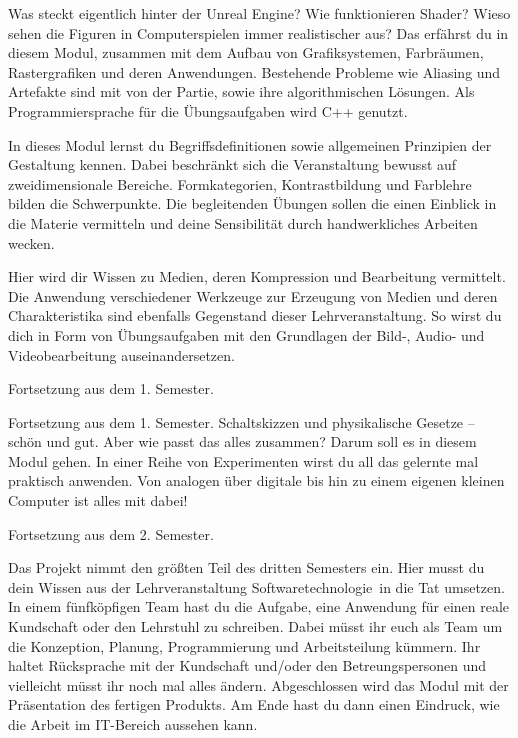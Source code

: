 Was steckt eigentlich hinter der Unreal Engine? Wie funktionieren Shader? 
Wieso sehen die Figuren in Computerspielen immer realistischer aus?
Das erfährst du in diesem Modul, zusammen mit dem Aufbau von Grafiksystemen, Farbräumen, Rastergrafiken und deren Anwendungen.
Bestehende Probleme wie Aliasing und Artefakte sind mit von der Partie, sowie ihre algorithmischen Lösungen.
Als Programmiersprache für die Übungsaufgaben wird C++ genutzt.

In dieses Modul lernst du Begriffsdefinitionen sowie allgemeinen Prinzipien der Gestaltung kennen.
Dabei beschränkt sich die Veranstaltung bewusst auf zweidimensionale Bereiche.
Formkategorien, Kontrastbildung und Farblehre bilden die Schwerpunkte.
Die begleitenden Übungen sollen die einen Einblick in die Materie vermitteln und deine Sensibilität durch handwerkliches Arbeiten wecken.

Hier wird dir Wissen zu Medien, deren Kompression und Bearbeitung vermittelt.
Die Anwendung verschiedener Werkzeuge zur Erzeugung von Medien und deren Charakteristika sind ebenfalls Gegenstand dieser Lehrveranstaltung.
So wirst du dich in Form von Übungsaufgaben mit den Grundlagen der Bild-, Audio- und Videobearbeitung auseinandersetzen.

Fortsetzung aus dem 1. Semester.

Fortsetzung aus dem 1. Semester. Schaltskizzen und physikalische Gesetze -- schön und gut. Aber wie passt das alles zusammen?
Darum soll es in diesem Modul gehen. In einer Reihe von Experimenten wirst du all das gelernte mal praktisch anwenden.
Von analogen über digitale bis hin zu einem eigenen kleinen Computer ist alles mit dabei!

\newpage


Fortsetzung aus dem 2. Semester.

Das Projekt nimmt den größten Teil des dritten Semesters ein.
Hier musst du dein Wissen aus der Lehrveranstaltung \glqq Softwaretechnologie\grqq\ in die Tat umsetzen.
In einem fünfköpfigen Team hast du die Aufgabe, eine Anwendung für einen reale Kundschaft oder den Lehrstuhl zu schreiben.
Dabei müsst ihr euch als Team um die Konzeption, Planung, Programmierung und Arbeitsteilung kümmern.
Ihr haltet Rücksprache mit der Kundschaft und/oder den Betreungspersonen und vielleicht müsst ihr noch mal alles ändern.
Abgeschlossen wird das Modul mit der Präsentation des fertigen Produkts.
Am Ende hast du dann einen Eindruck, wie die Arbeit im IT-Bereich aussehen kann.


